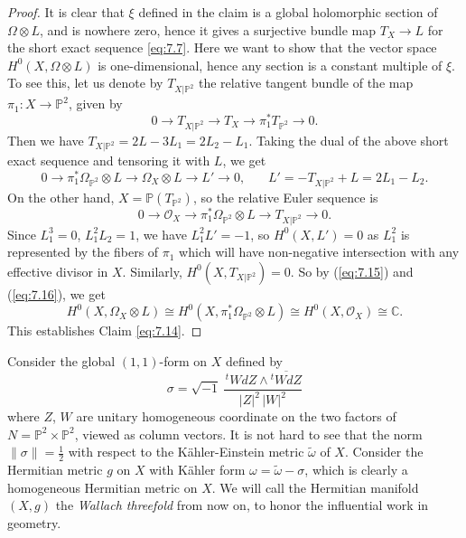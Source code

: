 \documentclass{amsart}
\numberwithin{equation}{section}
\theoremstyle{definition}
\renewcommand{\1}{\mathds{1}}
\renewcommand{\>}{\rightarrow}
\begin{document}
\begin{proof}
It is clear that $\xi$ defined in the claim is a global holomorphic section of $\Omega \otimes L$, and is nowhere zero, hence it gives a surjective bundle map $T_X \rightarrow L$ for the short exact sequence \eqref{eq:7.7}. Here we want to show that the vector space $H^0(X, \Omega \otimes L)$ is one-dimensional, hence any section is a constant multiple of $\xi$. To see this, let us denote by $T_{X|{\mathbb P}^2}$ the relative tangent bundle of the map $\pi_1: X \rightarrow {\mathbb P}^2$, given by
$$ 0 \rightarrow T_{X|{\mathbb P}^2} \rightarrow T_X \rightarrow \pi_1^{\ast}T_{{\mathbb P}^2} \rightarrow  0 .$$
Then we have $T_{X|{\mathbb P}^2}=2L-3L_1=2L_2-L_1$. Taking the dual of the above short exact sequence and tensoring it with $L$, we get
\begin{equation} \label{eq:7.15}
0 \rightarrow  \pi_1^{\ast}\Omega_{{\mathbb P}^2} \!\otimes \!L \rightarrow \Omega_X\! \otimes\! L \rightarrow L' \rightarrow  0 , \ \ \ \ \ \  \ \
L' = -T_{X|{\mathbb P}^2} + L = 2L_1-L_2.
\end{equation}
On the other hand, $X={\mathbb P}(T_{{\mathbb P}^2})$, so the relative Euler sequence is
\begin{equation} \label{eq:7.16}
0 \rightarrow  {\mathcal O}_X \rightarrow \pi_1^{\ast}\Omega_{{\mathbb P}^2} \!\otimes \!L \rightarrow  T_{X|{\mathbb P}^2} \rightarrow  0.
\end{equation}
Since $L^3_1=0$, $L_1^2L_2=1$, we have $L_1^2 L'=-1$, so $H^0(X,L')=0$ as $L^2_1$ is represented by the fibers of $\pi_1$ which will have non-negative intersection with any effective divisor in $X$. Similarly, $H^0(X, T_{X|{\mathbb P}^2})=0$. So by (\ref{eq:7.15}) and (\ref{eq:7.16}), we get
$$  H^0(X, \Omega_X\! \otimes \!L ) \cong H^0(X, \pi_1^{\ast}\Omega_{{\mathbb P}^2} \!\otimes \!L) \cong H^0(X,  {\mathcal O}_X) \cong {\mathbb C}. $$
This establishes Claim \ref{eq:7.14}.
\end{proof}

Consider the global $(1,1)$-form on $X$ defined by
\begin{equation} \label{eq:7.17}
\sigma = \sqrt{-1}\,\frac{\,^tWdZ \wedge \overline{^tWdZ} }{|Z|^2 \,|W|^2}
\end{equation}
where $Z$, $W$ are unitary homogeneous coordinate on the two factors of $N={\mathbb P}^2\times {\mathbb P}^2$, viewed as  column vectors. It is not hard to see that the norm $\parallel\! \!\sigma \!\!\parallel =\frac{1}{2}$ with respect to the K\"ahler-Einstein metric $\tilde{\omega}$ of $X$. Consider the Hermitian metric $g$ on $X$ with K\"ahler form $\omega = \tilde{\omega }- \sigma$, which is clearly a homogeneous Hermitian metric on $X$. We will call the Hermitian manifold $(X,g)$ the {\em Wallach threefold} from now on, to honor the influential work \cite{Wallach} in geometry.
\end{document}
